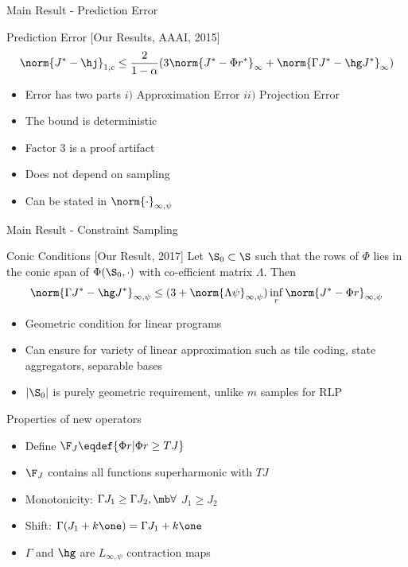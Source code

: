 \documentclass[10pt]{beamer}
\begin{document}
\begin{frame}[fragile]{Main Result - Prediction Error}

\begin{block}{Prediction Error [Our Results, AAAI, 2015]}
\begin{align*}
\norm{J^*-\hj}_{1,c}\leq \frac{2}{1-\alpha}( 3\norm{J^*-\Phi r^*}_{\infty}+ \norm{\Gamma J^*-\hg J^*}_{\infty})
\end{align*}
\end{block}


\begin{itemize}
\item Error has two parts $i)$ Approximation Error $ii)$ Projection Error
\item The bound is deterministic
\item Factor $3$ is a proof artifact
\item Does not depend on sampling
\item Can be stated in $\norm{\cdot}_{\infty,\psi}$
\end{itemize}
\end{frame}

\begin{frame}[fragile]{Main Result - Constraint Sampling}
\begin{block}{Conic Conditions [Our Result, 2017]}
Let $\S_0\subset \S$ such that the rows of $\Phi$ lies in the conic span of $\Phi(\S_0,\cdot)$ with co-efficient matrix $\Lambda$. Then
\begin{align*}
\norm{ \Gamma J^*-\hg J^* }_{\infty,\psi}\leq (3+\norm{\Lambda \psi}_{\infty,\psi})\inf_r\norm{J^*-\Phi r}_{
\infty,\psi}
\end{align*}
\end{block}


\begin{itemize}
\item Geometric condition for linear programs
\item Can ensure for variety of linear approximation such as tile coding, state aggregators, separable bases
\item $|\S_0|$ is purely geometric requirement, unlike $m$ samples for RLP
\end{itemize}
\end{frame}


\begin{frame}[fragile]{Properties of new operators}
\begin{itemize}
\item Define $\F_J\eqdef\{\Phi r | \Phi r\geq TJ \}$
\item $\F_J$ contains all functions superharmonic with $TJ$
\item {Monotonicity:} $\Gamma J_1\geq \Gamma J_2, \mb \forall$ $J_1\geq J_2$
\item {Shift:} $\Gamma (J_1+k\one)= \Gamma J_1+ k\one$
\item $\Gamma$ and $\hg$ are $L_{\infty,\psi}$ contraction maps
\end{itemize}

\end{frame}
\end{document}
